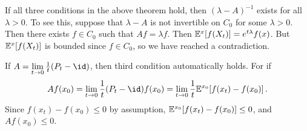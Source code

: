 \documentclass[../../../Master/AppliedStochastics.tex]{subfiles}
\begin{document}
\begin{note}
    If all three conditions in the above theorem hold,
        then $(\lambda - A)^{-1}$ exists for all $\lambda > 0$.
    To see this, suppose that $\lambda - A$ is not invertible on $C_0$
        for some $\lambda > 0$. 
    Then there exists $f \in C_0$ such that $Af = \lambda f$.
    Then $\mathbb{E}^x[f(X_t)] = e^{t \lambda} f(x)$.
    But $\mathbb{E}^x[f(X_t)]$ is bounded since $f \in C_0$,
        so we have reached a contradiction. 
\end{note}


\begin{note}
    If $A = \lim\limits_{t \to 0} \frac{1}{t} (P_t - \id)$,
        then third condition automatically holds.
    For if
    $$\begin{aligned}
        A f(x_0) = \lim_{t \to 0} \frac{1}{t} (P_t - \id) f(x_0)
                 = \lim_{t \to 0} \frac{1}{t} \E^{x_0} [f(x_t) - f(x_0)]\,.
    \end{aligned}$$
    Since $f(x_t) - f(x_0) \leq 0$ by assumption,
        $\mathbb{E}^{x_0} [f(x_t) - f(x_0)] \leq 0$, and $A f(x_0) \leq 0$. 
\end{note}


%
\end{document}
